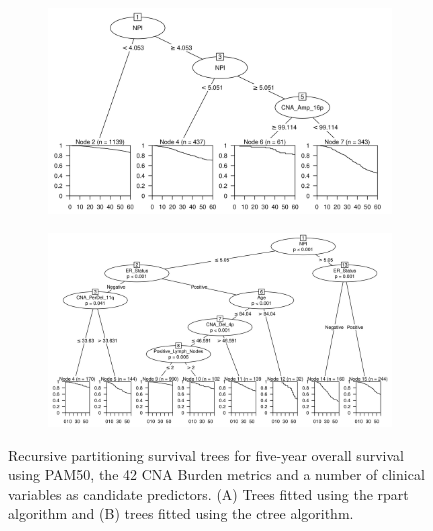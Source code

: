 \begin{figure}[!htb]
\centering

\vspace{1cm}

\begin{subfigure}{\textwidth}
\subcaption{}
\includegraphics[width=1\textwidth]{../figures/Appendices/Appendix_B/Clin_PA_PartyKit_Survival_Burden_FiveYearOS_PAM50.png}
\end{subfigure}

\vspace{2cm}

\begin{subfigure}{\textwidth}
\subcaption{}
\includegraphics[width=1\textwidth]{../figures/Appendices/Appendix_B/Clin_PA_Ctree_Survival_Burden_FiveYearOS_PAM50.png}
\end{subfigure}

\vspace{1cm}

\caption[Recursive partitioning survival trees for five-year overall survival using PAM50, the 42 CNA Burden metrics and a number of clinical variables as candidate predictors.]{Recursive partitioning survival trees for five-year overall survival using PAM50, the 42 CNA Burden metrics and a number of clinical variables as candidate predictors. (A) Trees fitted using the rpart algorithm and (B) trees fitted using the ctree algorithm.}
\end{figure}

